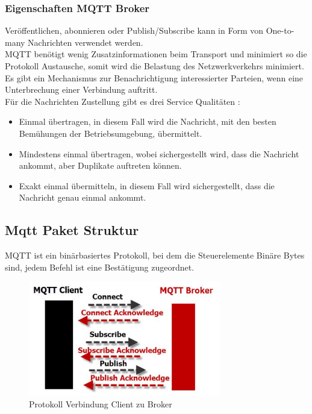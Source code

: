 \subsubsection{Eigenschaften MQTT Broker}
Veröffentlichen, abonnieren oder  Publish/Subscribe kann in Form von One-to-many Nachrichten verwendet werden.\\
MQTT benötigt wenig Zusatzinformationen beim Transport und minimiert so die Protokoll Austausche, somit wird die Belastung des Netzwerkverkehrs minimiert.\\
Es gibt ein Mechanismus zur Benachrichtigung interessierter Parteien, wenn eine Unterbrechung einer Verbindung auftritt.\\
Für die Nachrichten Zustellung gibt es drei Service Qualitäten \cite{steve_understanding_nodate}:\\
\begin{itemize}
	\item Einmal übertragen, in diesem Fall wird die Nachricht, mit den besten Bemühungen der Betriebsumgebung, übermittelt.\\
		\item Mindestens einmal übertragen, wobei sichergestellt wird, dass die Nachricht ankommt, aber Duplikate auftreten können.\\
	\item Exakt einmal übermitteln, in diesem Fall wird sichergestellt, dass die Nachricht genau einmal ankommt.
\end{itemize}

\subsection{Mqtt Paket Struktur}
MQTT ist ein binärbasiertes Protokoll, bei dem die Steuerelemente Binäre Bytes sind, jedem Befehl ist eine Bestätigung zugeordnet.

\begin{figure}[H]
	\centering
	\includegraphics[width=0.75\textwidth]{graphics/MQTTProtocolCommands.jpg}
	\caption{Protokoll Verbindung Client zu Broker \cite{steve_understanding_nodate}} 	
	\label{pic: MQTTBrokerToClient}
\end{figure} 


